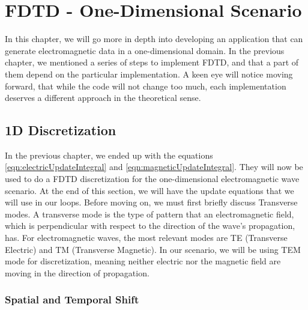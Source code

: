 
\chapter{FDTD - One-Dimensional Scenario} %

\label{Chapter2} %

In this chapter, we will go more in depth into developing an application that can generate electromagnetic data in a one-dimensional domain. In the previous chapter, we mentioned a series of steps to implement FDTD, and that a part of them depend on the particular implementation. A keen eye will notice moving forward, that while the code will not change too much, each implementation deserves a different approach in the theoretical sense.


\section{1D Discretization}

In the previous chapter, we ended up with the equations \ref{eqn:electricUpdateIntegral} and \ref{eqn:magneticUpdateIntegral}. They will now be used to do a FDTD discretization for the one-dimensional electromagnetic wave scenario. At the end of this section, we will have the update equations that we will use in our loops. Before moving on, we must first briefly discuss Transverse modes. A transverse mode is the type of pattern that an electromagnetic field, which is perpendicular with respect to the direction of the wave's propagation, has. For electromagnetic waves, the most relevant modes are TE (Transverse Electric) and TM (Transverse Magnetic). In our scenario, we will be using TEM mode for discretization, meaning neither electric nor the magnetic field are moving in the direction of propagation.

\subsection{Spatial and Temporal Shift}

